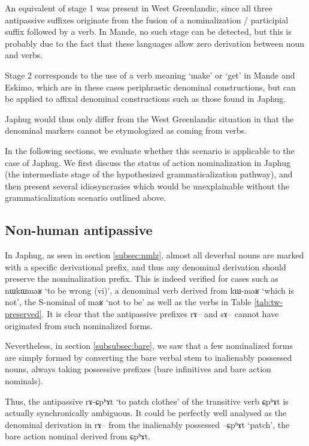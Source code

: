 \documentclass[oldfontcommands,oneside,a4paper,11pt]{article}
\newcommand{\ipa}[1]{{\phon \mbox{#1}}} %
\begin{document}
An equivalent of stage 1  was present in West Greenlandic, since all three antipassive suffixes originate from the fusion of a nominalization / participial suffix followed by a verb. In Mande, no such stage can be detected, but this is probably due to the fact that these languages allow zero derivation between noun and verbs.

Stage 2 corresponds to the use of a verb meaning `make' or `get' in Mande and Eskimo, which  are in these cases periphrastic denominal constructions, but can be applied to affixal denominal constructions such as those found in Japhug.

Japhug would thus only differ  from the West Greenlandic situation in that the denominal markers cannot be etymologized as coming from verbs.

In the following sections, we evaluate whether this scenario is applicable to the case of Japhug. We first discuss the status of   action nominalization in Japhug (the intermediate stage of the hypothesized grammaticalization pathway), and then present several idiosyncrasies which would be unexplainable without the grammaticalization scenario outlined above. 

\subsection{Non-human antipassive} \label{subsec:nmlz.denom}
In Japhug, as seen in section \ref{subsec:nmlz}, almost all deverbal nouns are marked with a specific derivational prefix, and thus any denominal derivation should preserve the nominalization prefix. This is indeed verified for cases such as  \ipa{nɯkɯmaʁ} `to be wrong (vi)', a denominal verb derived from \ipa{kɯ-maʁ} `which is not', the S-nominal of \ipa{maʁ} `not to be' as well as the verbs in Table \ref{tab:tw-preserved}. It is clear that the antipassive prefixes \ipa{rɤ}-- and \ipa{sɤ}-- cannot have originated from such nominalized forms.

Nevertheless, in section \ref{subsubsec:bare}, we saw that a few nominalized forms are simply formed by converting the bare verbal stem to  inalienably possessed nouns, always taking possessive prefixes (bare infinitives and bare action nominals).

Thus, the antipassive \ipa{rɤ-ɕpʰɤt} `to patch clothes' of the transitive verb \ipa{ɕpʰɤt} is actually synchronically ambiguous. It could be perfectly well analysed as the denominal derivation in \ipa{rɤ}-- from the inalienably possessed \ipa{--ɕpʰɤt} `patch', the bare action nominal derived from \ipa{ɕpʰɤt}.
\end{document}
